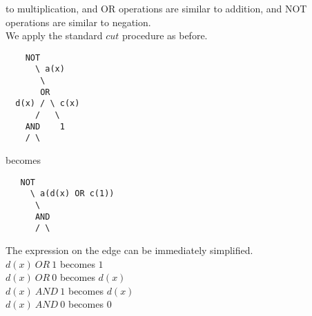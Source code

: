 \documentclass[10pt]{article}
\begin{document}
to multiplication, and OR operations are similar to addition, and NOT operations are similar to negation.\\
We apply the standard $cut$ procedure as before.\\
\begin{verbatim}
    NOT
      \ a(x)
       \
       OR
  d(x) / \ c(x)
      /   \
    AND    1
    / \
\end{verbatim}
becomes
\begin{verbatim}
   NOT
     \ a(d(x) OR c(1))
      \
      AND
      / \
\end{verbatim}
The expression on the edge can be immediately simplified.\\
$d(x)~OR~1$ becomes $1$\\
$d(x)~OR~0$ becomes $d(x)$\\
$d(x)~AND~1$ becomes $d(x)$\\
$d(x)~AND~0$ becomes $0$\\
\end{document}
